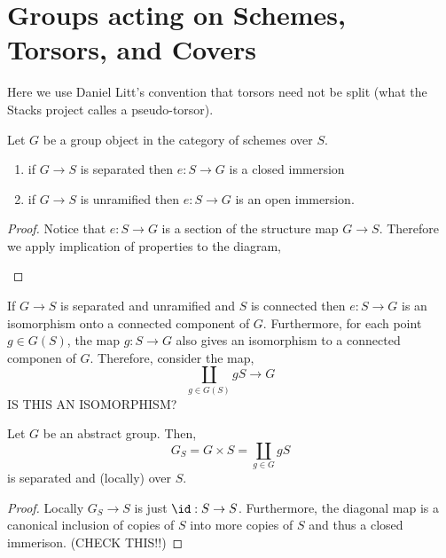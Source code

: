 \documentclass[12pt]{article}
\begin{document}
\section{Groups acting on Schemes, Torsors, and Covers}

\begin{rmk}
Here we use Daniel Litt's convention that torsors need not be split (what the Stacks project calles a pseudo-torsor).
\end{rmk}

\begin{prop}
Let $G$ be a group object in the category of schemes over $S$. 
\begin{enumerate}
\item if $G \to S$ is separated then $e : S \to G$ is a closed immersion
\item if $G \to S$ is unramified then $e : S \to G$ is an open immersion.
\end{enumerate}
\end{prop}

\begin{proof}
Notice that $e : S \to G$ is a section of the structure map $G \to S$. Therefore we apply implication of properties to the diagram,
\begin{center}
\end{center}
\end{proof}

\begin{rmk}
If $G \to S$ is separated and unramified and $S$ is connected then $e : S \to G$ is an isomorphism onto a connected component of $G$. Furthermore, for each point $g \in G(S)$, the map $g : S \to G$ also gives an isomorphism to a connected componen of $G$. Therefore, consider the map,
\[ \coprod_{g \in G(S)} g S \to G \]
IS THIS AN ISOMORPHISM?
\end{rmk}

\begin{prop}
Let $G$ be an abstract group. Then,
\[ G_S = G \times S = \coprod_{g \in G} g S \]
is separated and (locally) \etale over $S$.
\end{prop}

\begin{proof}
Locally $G_S \to S$ is just $\id : S \to S$. Furthermore, the diagonal map is a canonical inclusion of copies of $S$ into more copies of $S$ and thus a closed immerison. (CHECK THIS!!)
\end{proof}
\end{document}
